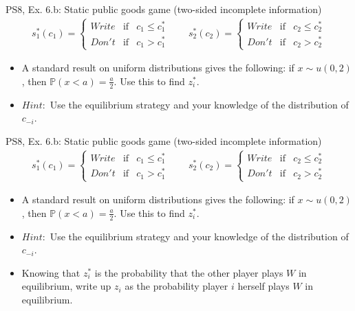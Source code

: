 \begin{frame}{PS8, Ex. 6.b: Static public goods game (two-sided incomplete information)}
    \begin{align*}
      s_1^*(c_1)=\left\{\begin{array}{rcl}
        Write & \text{if} & c_1\leq c_1^*\\
        Don't & \text{if} & c_1>c_1^*
        \end{array}\right.\quad\quad
      s_2^*(c_2)=\left\{\begin{array}{rcl}
        Write & \text{if} & c_2\leq c_2^*\\
        Don't & \text{if} & c_2>c_2^*
        \end{array}\right.
    \end{align*}
    \vspace{-12pt}
    \begin{itemize}
      \item[(b)] A standard result on uniform distributions gives the following: if $x\sim u(0, 2)$, then $\mathbb{P}(x<a)=\frac{a}{2}$. Use this to find $z_i^*$.
      \item[]    $Hint:$ Use the equilibrium strategy and your knowledge of the distribution of $c_{-i}$.
    \end{itemize}
    \vfill\null
\end{frame}
\begin{frame}{PS8, Ex. 6.b: Static public goods game (two-sided incomplete information)}
    \begin{align*}
      s_1^*(c_1)=\left\{\begin{array}{rcl}
        Write & \text{if} & c_1\leq c_1^*\\
        Don't & \text{if} & c_1>c_1^*
        \end{array}\right.\quad\quad
      s_2^*(c_2)=\left\{\begin{array}{rcl}
        Write & \text{if} & c_2\leq c_2^*\\
        Don't & \text{if} & c_2>c_2^*
        \end{array}\right.
    \end{align*}
    \vspace{-12pt}
    \begin{itemize}
      \item[(b)] A standard result on uniform distributions gives the following: if $x\sim u(0, 2)$, then $\mathbb{P}(x<a)=\frac{a}{2}$. Use this to find $z_i^*$.
      \item[]    $Hint:$ Use the equilibrium strategy and your knowledge of the distribution of $c_{-i}$.
    \end{itemize}
    \begin{multicols}{2}
      \begin{itemize}
        \item[Step 1:] Knowing that $z_i^*$ is the probability that the other player plays $W$ in equilibrium, write up $z_i$ as the probability player $i$ herself plays $W$ in equilibrium.
      \end{itemize}
      \vfill\null\columnbreak
      \vfill\null
    \end{multicols}
\end{frame}
